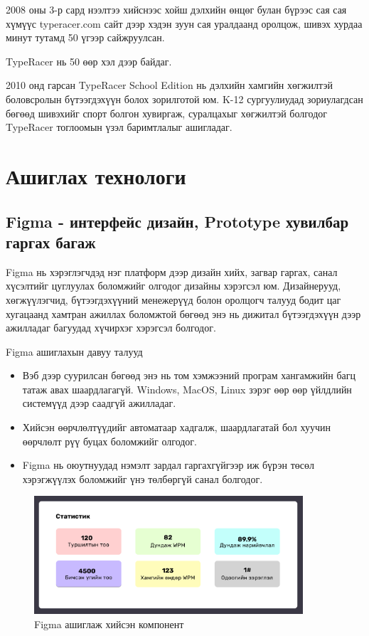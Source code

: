 2008 оны 3-р сард нээлтээ хийснээс хойш дэлхийн өнцөг булан бүрээс сая сая хүмүүс typeracer.com сайт дээр хэдэн зуун сая уралдаанд оролцож, шивэх хурдаа минут тутамд 50 үгээр сайжруулсан.

TypeRacer нь 50 өөр хэл дээр байдаг.

2010 онд гарсан TypeRacer School Edition нь дэлхийн хамгийн хөгжилтэй боловсролын бүтээгдэхүүн болох зорилготой юм. K-12 сургуулиудад зориулагдсан бөгөөд шивэхийг спорт болгон хувиргаж, суралцахыг хөгжилтэй болгодог TypeRacer тоглоомын үзэл баримтлалыг ашигладаг.
\section{Ашиглах технологи}

\subsection{Figma - интерфейс дизайн, Prototype хувилбар гаргах багаж}
Figma нь хэрэглэгчдэд нэг платформ дээр дизайн хийх, загвар гаргах, санал хүсэлтийг цуглуулах боломжийг олгодог дизайны хэрэгсэл юм. Дизайнерууд, хөгжүүлэгчид, бүтээгдэхүүний менежерүүд болон оролцогч талууд бодит цаг хугацаанд хамтран ажиллах боломжтой бөгөөд энэ нь дижитал бүтээгдэхүүн дээр ажилладаг багуудад хүчирхэг хэрэгсэл болгодог.

Figma ашиглахын давуу талууд
\begin{itemize}
	\item Вэб дээр суурилсан бөгөөд энэ нь том хэмжээний програм хангамжийн багц татаж авах шаардлагагүй. Windows, MacOS, Linux зэрэг өөр өөр үйлдлийн системүүд дээр саадгүй ажилладаг.
	\item Хийсэн өөрчлөлтүүдийг автоматаар хадгалж, шаардлагатай бол хуучин өөрчлөлт рүү буцах боломжийг олгодог.
	\item Figma нь оюутнуудад нэмэлт зардал гаргахгүйгээр иж бүрэн төсөл хэрэгжүүлэх боломжийг үнэ төлбөргүй санал болгодог.
\end{itemize}

\begin{figure}[h]
	\centering
	\includegraphics[width=10cm]{images/figma_component.png}
	\caption{Figma ашиглаж хийсэн компонент}
	\label{fig:figma}
\end{figure}

